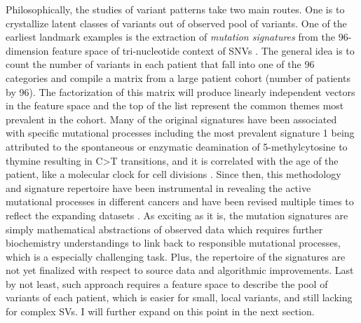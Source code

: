 \documentclass[phd,tocprelim]{cornell}
\begin{document}
Philosophically, the studies of variant patterns take two main routes. One is to crystallize latent classes of variants out of observed pool of variants. One of the earliest landmark examples is the extraction of \textit{mutation signatures} from the 96-dimension feature space of tri-nucleotide context of SNVs \cite{Alexandrov2013-zv}. The general idea is to count the number of variants in each patient that fall into one of the 96 categories and compile a matrix from a large patient cohort (number of patients by 96). The factorization of this matrix will produce linearly independent vectors in the feature space and the top of the list represent the common themes most prevalent in the cohort. Many of the original signatures have been associated with specific mutational processes including the most prevalent signature 1 being attributed to the spontaneous or enzymatic deamination of 5-methylcytosine to thymine resulting in C>T transitions, and it is correlated with the age of the patient, like a molecular clock for cell divisions \cite{alexandrov2013}. Since then, this methodology and signature repertoire have been instrumental in revealing the active mutational processes in different cancers \cite{Choi2021-pu} and have been revised multiple times to reflect the expanding datasets \cite{Alexandrov2020-by}. As exciting as it is, the mutation signatures are simply mathematical abstractions of observed data which requires further biochemistry understandings to link back to responsible mutational processes, which is a especially challenging task. Plus, the repertoire of the signatures are not yet finalized with respect to source data and algorithmic improvements. Last by not least, such approach requires a feature space to describe the pool of variants of each patient, which is easier for small, local variants, and still lacking for complex SVs. I will further expand on this point in the next section.
\end{document}
